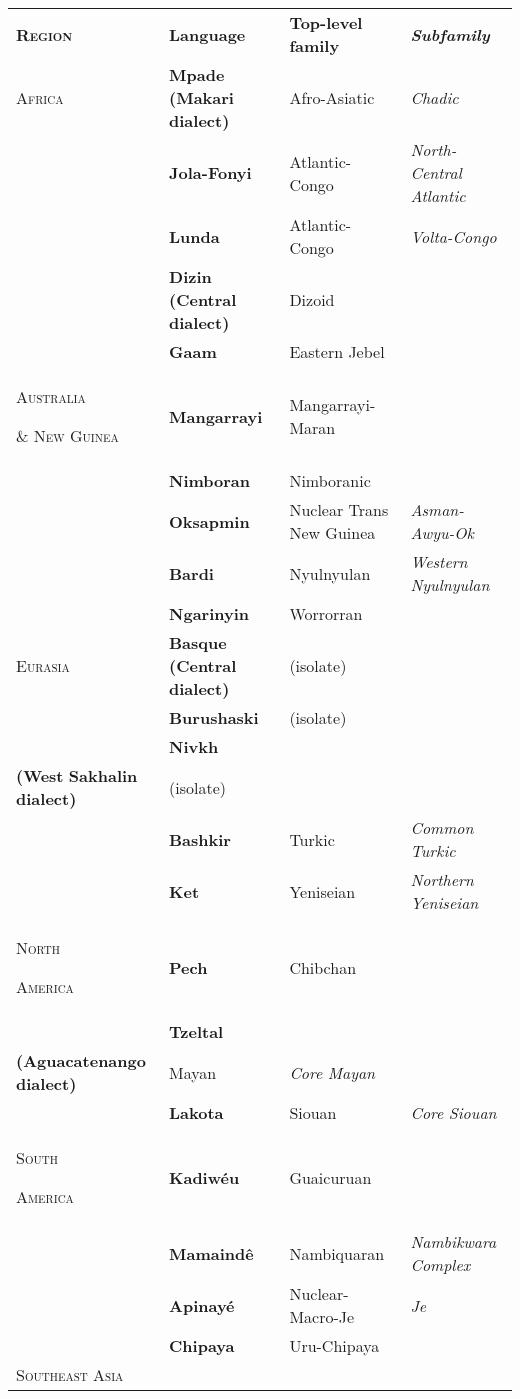 \begin{table}
\begin{tabularx}{\textwidth}{XXXX}
\lsptoprule

\textbf{\textsc{Region}} & \textbf{Language} & \textbf{Top-level} \textbf{family} & \textbf{\textit{Subfamily}}\\
\textsc{Africa} & \textbf{Mpade} \textbf{(Makari} \textbf{dialect)} & Afro-Asiatic & \textit{Chadic}\\
\hhline{-~~~} & \textbf{Jola-Fonyi} & Atlantic-Congo & \textit{North-Central} \textit{Atlantic}\\
& \textbf{Lunda} & Atlantic-Congo & \textit{Volta-Congo}\\
& \textbf{Dizin} \textbf{(Central} \textbf{dialect)} & Dizoid & \\
& \textbf{Gaam} & Eastern Jebel & \\
\textsc{Australia} 

\textsc{\&} \textsc{New} \textsc{Guinea} & \textbf{Mangarrayi} & Mangarrayi-Maran & \\
\hhline{-~~~} & \textbf{Nimboran} & Nimboranic & \\
& \textbf{Oksapmin} & Nuclear Trans New Guinea & \textit{Asman-Awyu-Ok}\\
& \textbf{Bardi} & Nyulnyulan & \textit{Western} \textit{Nyulnyulan}\\
& \textbf{Ngarinyin} & Worrorran & \\
\textsc{Eurasia} & \textbf{Basque} \textbf{(Central} \textbf{dialect)} & (isolate) & \\
\hhline{-~~~} & \textbf{Burushaski} & (isolate) & \\
& \textbf{Nivkh} \\
\textbf{(West} \textbf{Sakhalin} \textbf{dialect)} & (isolate) & \\
& \textbf{Bashkir} & Turkic & \textit{Common} \textit{Turkic}\\
& \textbf{Ket} & Yeniseian & \textit{Northern} \textit{Yeniseian}\\
\textsc{North} 

\textsc{America} & \textbf{Pech} & Chibchan & \\
\hhline{-~~~} & \textbf{Tzeltal} \\
\textbf{(Aguacatenango} \textbf{dialect)} & Mayan & \textit{Core} \textit{Mayan}\\
& \textbf{Lakota} & Siouan & \textit{Core} \textit{Siouan}\\
\textsc{South} 

\textsc{America} & \textbf{Kadiwéu} & Guaicuruan & \\
\hhline{-~~~} & \textbf{Mamaindê} & Nambiquaran & \textit{Nambikwara} \textit{Complex}\\
& \textbf{Apinayé} & Nuclear-Macro-Je & \textit{Je}\\
& \textbf{Chipaya} & Uru-Chipaya & \\
\textsc{Southeast} \textsc{Asia} 


\end{tabularx}
\end{table}
